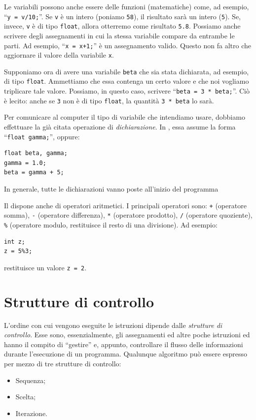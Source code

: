 Le variabili possono anche essere delle funzioni (matematiche) come, ad esempio, ``\lstinline!y = v/10;!''.
Se \lstinline!v! è un intero (poniamo \lstinline!58!), il risultato sarà un intero (\lstinline!5!).
Se, invece, \lstinline!v! è di tipo \lstinline!float!, allora otterremo come risultato \lstinline!5.8!.
Possiamo anche scrivere degli assegnamenti in cui la stessa variabile compare da entrambe le parti.
Ad esempio, ``\lstinline!x = x+1;!'' è un assegnamento valido.
Questo non fa altro che aggiornare il valore della variabile \lstinline!x!.

Supponiamo ora di avere una variabile \lstinline!beta! che sia stata dichiarata, ad esempio, di tipo \lstinline!float!.
Ammettiamo che essa contenga un certo valore e che noi vogliamo triplicare tale valore.
Possiamo, in questo caso, scrivere ``\lstinline!beta = 3 * beta;!''.
Ciò è lecito: anche se \lstinline!3! non è di tipo \lstinline!float!, la quantità \lstinline!3 * beta! lo sarà. 

Per  comunicare al computer il tipo di variabile che intendiamo usare, dobbiamo effettuare la già citata operazione di \emph{dichiarazione}.
In , essa assume la forma ``\lstinline!float gamma;!'', oppure:
\begin{lstlisting}
float beta, gamma;
gamma = 1.0;
beta = gamma + 5;
\end{lstlisting}
In generale, tutte le dichiarazioni vanno poste all'inizio del programma

Il  dispone anche di operatori aritmetici. I  principali operatori sono: \lstinline!+! (operatore somma), \lstinline!-! (operatore differenza), \lstinline!*! (operatore prodotto), \lstinline!/! (operatore quoziente), \lstinline!%! (operatore modulo, restituisce il resto di una divisione). Ad esempio:
\begin{lstlisting}
int z;
z = 5%3;
\end{lstlisting}
restituisce un valore \lstinline!z = 2!.

	\section{Strutture di controllo}
	\label{sec:ContStruc}
L'ordine con cui vengono eseguite le istruzioni dipende dalle \emph{strutture di controllo}.
Esse sono, essenzialmente, gli assegnamenti ed altre poche istruzioni ed hanno il compito di ``gestire'' e, appunto, controllare il flusso delle informazioni durante l'esecuzione di un programma.
Qualunque algoritmo può essere espresso per mezzo di tre strutture di controllo:
\begin{itemize}
	\item
Sequenza;
	\item
Scelta;
	\item
Iterazione.
\end{itemize}

